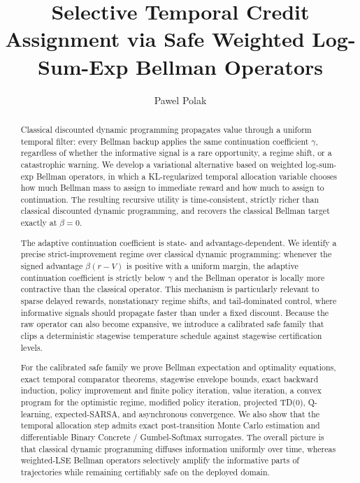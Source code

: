 \documentclass{article}
\title{Selective Temporal Credit Assignment via Safe Weighted Log-Sum-Exp Bellman Operators}
\author{Pawel Polak}
\date{}
\theoremstyle{remark}
\begin{document}
\maketitle

\begin{abstract}
Classical discounted dynamic programming propagates value through a uniform temporal filter: every Bellman backup applies the same continuation coefficient $\gamma$, regardless of whether the informative signal is a rare opportunity, a regime shift, or a catastrophic warning. We develop a variational alternative based on weighted log-sum-exp Bellman operators, in which a KL-regularized temporal allocation variable chooses how much Bellman mass to assign to immediate reward and how much to assign to continuation. The resulting recursive utility is time-consistent, strictly richer than classical discounted dynamic programming, and recovers the classical Bellman target exactly at $\beta=0$.

The adaptive continuation coefficient is state- and advantage-dependent. We identify a precise strict-improvement regime over classical dynamic programming: whenever the signed advantage $\beta(r-V)$ is positive with a uniform margin, the adaptive continuation coefficient is strictly below $\gamma$ and the Bellman operator is locally more contractive than the classical operator. This mechanism is particularly relevant to sparse delayed rewards, nonstationary regime shifts, and tail-dominated control, where informative signals should propagate faster than under a fixed discount. Because the raw operator can also become expansive, we introduce a calibrated safe family that clips a deterministic stagewise temperature schedule against stagewise certification levels.

For the calibrated safe family we prove Bellman expectation and optimality equations, exact temporal comparator theorems, stagewise envelope bounds, exact backward induction, policy improvement and finite policy iteration, value iteration, a convex program for the optimistic regime, modified policy iteration, projected TD(0), Q-learning, expected-SARSA, and asynchronous convergence. We also show that the temporal allocation step admits exact post-transition Monte Carlo estimation and differentiable Binary Concrete / Gumbel-Softmax surrogates. The overall picture is that classical dynamic programming diffuses information uniformly over time, whereas weighted-LSE Bellman operators selectively amplify the informative parts of trajectories while remaining certifiably safe on the deployed domain.
\end{abstract}
\end{document}
